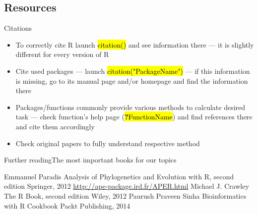 \documentclass[compress, ucs, xelatex, 11pt, xcolor=svgnames,
  hyperref={
    bookmarks=true,
    unicode=true,
    colorlinks=true,
    pdftitle={Molecular data in R},
    plainpages=false,
    pdfauthor={Vojtech Zeisek},
    pdfsubject={Course about phylogeny and evolution in R},
    pdfcreator={XeLaTeX},
    pdfkeywords={R, evolution, phylogeny, molecular data},
    linkcolor=Tomato,
    anchorcolor=SaddleBrown,
    citecolor=Goldenrod,
    filecolor=DarkMagenta,
    menucolor=Sienna,
    urlcolor=DarkTurquoise,
    pdftex},
  url={hyphens, lowtilde} %
  ]{beamer}
\renewcommand{\texttt}[1]{\hl{\ttfamily #1}}
\begin{document}
\subsection{Resources}

\begin{frame}{Citations}
  \begin{itemize}
    \item To correctly cite R launch \texttt{citation()} and see information there --- it is slightly different for every version of R
    \item Cite used packages --- launch \texttt{citation("PackageName")} --- if this information is missing, go to its manual page and/or homepage and find the information there
    \item Packages/functions commonly provide various methods to calculate desired task --- check function's help page (\texttt{\textbf{?}FunctionName}) and find references there and cite them accordingly
    \item Check original papers to fully understand respective method
  \end{itemize}
\end{frame}

\begin{frame}{Further reading}{The most important books for our topics}
  \begin{thebibliography}{1}
      Emmanuel Paradis
      \newblock Analysis of Phylogenetics and Evolution with R, second edition
      \newblock Springer, 2012
      \newblock \url{http://ape-package.ird.fr/APER.html}
      Michael J. Crawley
      \newblock The R Book, second edition
      \newblock Wiley, 2012
      Paurush Praveen Sinha
      \newblock Bioinformatics with R Cookbook
      \newblock Packt Publishing, 2014
  \end{thebibliography}
\end{frame}
\end{document}
